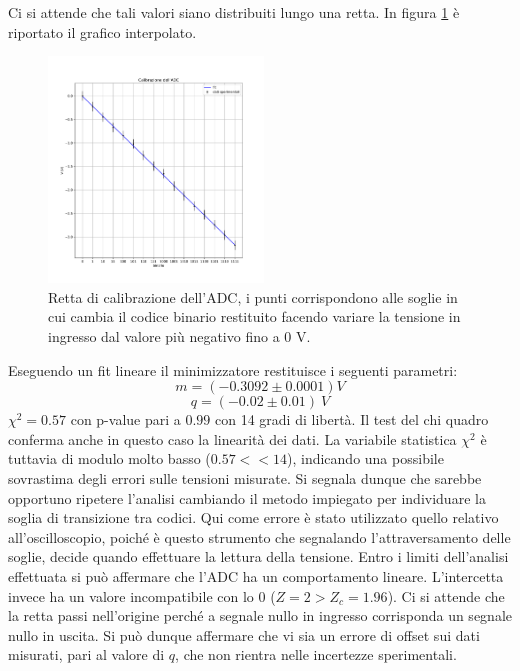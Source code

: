 \documentclass[journal]{IEEEtran}
\begin{document}
Ci si attende che tali valori siano distribuiti lungo una retta. In figura \ref{fig:graph_calibrazione_adc} è riportato il grafico interpolato.

\vspace{-5mm}

\begin{figure}[H]%
\centering
\begin{center}
\includegraphics[width=0.51\textwidth]{analysis/output/calibrazione_adc.pdf}
\end{center}
\caption{Retta di calibrazione dell'ADC, i punti corrispondono alle soglie in cui cambia il codice binario restituito facendo variare la tensione in ingresso dal valore più negativo fino a 0 V.}
\label{fig:graph_calibrazione_adc}
\end{figure}

Eseguendo un fit lineare il minimizzatore restituisce i seguenti parametri:
\[ m = (-0.3092 \pm 0.0001) V \] 
\[ q = (-0.02 \pm 0.01) \ V \] 
$ \chi^{2} = 0.57 $ con p-value pari a $0.99$ con 14 gradi di libertà.
\newline
Il test del chi quadro conferma anche in questo caso la linearità dei dati. La variabile statistica $\chi^2$ è tuttavia di modulo molto basso ($0.57 << 14$), indicando una possibile sovrastima degli errori sulle tensioni misurate. Si segnala dunque che sarebbe opportuno ripetere l'analisi cambiando il metodo impiegato per individuare la soglia di transizione tra codici. Qui come errore è stato utilizzato quello relativo all'oscilloscopio, poiché è questo strumento che segnalando l'attraversamento delle soglie, decide quando effettuare la lettura della tensione. Entro i limiti dell'analisi effettuata si può affermare che l'ADC ha un comportamento lineare.
L'intercetta invece ha un valore incompatibile con lo 0 ($Z = 2 > Z_c = 1.96$). Ci si attende che la retta passi nell'origine perché a segnale nullo in ingresso corrisponda un segnale nullo in uscita. Si può dunque affermare che vi sia un errore di offset sui dati misurati, pari al valore di $q$, che non rientra nelle incertezze sperimentali.
\end{document}
